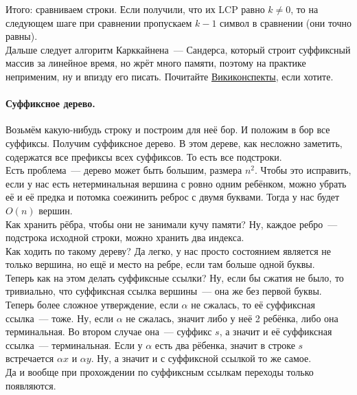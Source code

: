 \documentclass{article}
\begin{document}
    Итого: сравниваем строки. Если получили, что их LCP равно $k\neq0$, то на следующем шаге при сравнении пропускаем $k-1$ символ в сравнении (они точно равны).\\
    Дальше следует алгоритм Карккайнена~--- Сандерса, который строит суффиксный массив за линейное время, но жрёт много памяти, поэтому на практике неприменим, ну и впизду его писать. Почитайте \href{https://neerc.ifmo.ru/wiki/index.php?title=%D0%90%D0%BB%D0%B3%D0%BE%D1%80%D0%B8%D1%82%D0%BC_%D0%9A%D0%B0%D1%80%D0%BA%D0%BA%D0%B0%D0%B9%D0%BD%D0%B5%D0%BD%D0%B0-%D0%A1%D0%B0%D0%BD%D0%B4%D0%B5%D1%80%D1%81%D0%B0}{Викиконспекты}, если хотите.
    \paragraph{Суффиксное дерево.}
    Возьмём какую-нибудь строку и построим для неё бор. И положим в бор все суффиксы. Получим суффиксное дерево. В этом дереве, как несложно заметить, содержатся все префиксы всех суффиксов. То есть все подстроки.\\
    Есть проблема~--- дерево может быть большим, размера $n^2$. Чтобы это исправить, если у нас есть нетерминальная вершина с ровно одним ребёнком, можно убрать её и её предка и потомка соежинить реброс с двумя буквами. Тогда у нас будет $O(n)$ вершин.\\
    Как хранить рёбра, чтобы они не занимали кучу памяти? Ну, каждое ребро~--- подстрока исходной строки, можно хранить два индекса.\\
    Как ходить по такому дереву? Да легко, у нас просто состоянием является не только вершина, но ещё и место на ребре, если там больше одной буквы.\\
    Теперь как на этом делать суффиксные ссылки? Ну, если бы сжатия не было, то тривиально, что суффиксная ссылка вершины~--- она же без первой буквы. Теперь более сложное утверждение, если $\alpha$ не сжалась, то её суффиксная ссылка~--- тоже. Ну, если $\alpha$ не сжалась, значит либо у неё 2 ребёнка, либо она терминальная. Во втором случае она~--- суффикс $s$, а значит и её суффиксная ссылка~--- терминальная. Если у $\alpha$ есть два рёбенка, значит в строке $s$ встречается $\alpha x$ и $\alpha y$. Ну, а значит и с суффиксной ссылкой то же самое.\\
    Да и вообще при прохождении по суффиксным ссылкам переходы только появляются.
    
\end{document}
